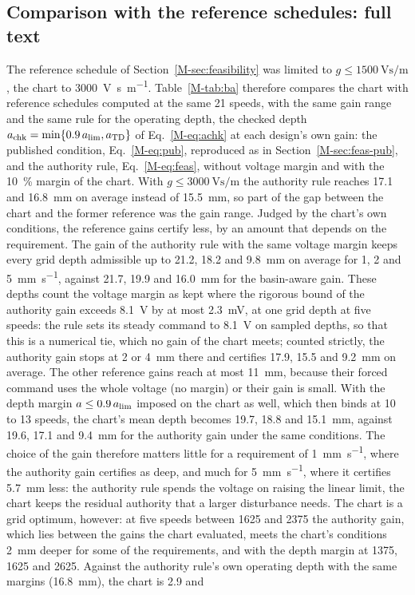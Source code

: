 \subsection{Comparison with the reference schedules: full text}\label{supp:std-ba-compare}

The reference schedule of Section~\ref{M-sec:feasibility} was limited to $g\le\SI{1500}{\volt\second\per\metre}$, the chart to \SI{3000}{\volt\second\per\metre}. Table~\ref{M-tab:ba} therefore compares the chart with reference schedules computed at the same 21 speeds, with the same gain range and the same rule for the operating depth, the checked depth $a_{\mathrm{chk}}=\min\{0.9\,a_{\lim},a_{\mathrm{TD}}\}$ of Eq.~\eqref{M-eq:achk} at each design's own gain: the published condition, Eq.~\eqref{M-eq:pub}, reproduced as in Section~\ref{M-sec:feas-pub}, and the authority rule, Eq.~\eqref{M-eq:feas}, without voltage margin and with the \SI{10}{\percent} margin of the chart. With $g\le\SI{3000}{\volt\second\per\metre}$ the authority rule reaches 17.1 and \SI{16.8}{\milli\metre} on average instead of \SI{15.5}{\milli\metre}, so part of the gap between the chart and the former reference was the gain range. Judged by the chart's own conditions, the reference gains certify less, by an amount that depends on the requirement. The gain of the authority rule with the same voltage margin keeps every grid depth admissible up to 21.2, 18.2 and \SI{9.8}{\milli\metre} on average for 1, 2 and \SI{5}{\milli\metre\per\second}, against 21.7, 19.9 and \SI{16.0}{\milli\metre} for the basin-aware gain. These depths count the voltage margin as kept where the rigorous bound of the authority gain exceeds \SI{8.1}{\volt} by at most \SI{2.3}{\milli\volt}, at one grid depth at five speeds: the rule sets its steady command to \SI{8.1}{\volt} on sampled depths, so that this is a numerical tie, which no gain of the chart meets; counted strictly, the authority gain stops at 2 or \SI{4}{\milli\metre} there and certifies 17.9, 15.5 and \SI{9.2}{\milli\metre} on average. The other reference gains reach at most \SI{11}{\milli\metre}, because their forced command uses the whole voltage (no margin) or their gain is small. With the depth margin $a\le0.9\,a_{\lim}$ imposed on the chart as well, which then binds at 10 to 13 speeds, the chart's mean depth becomes 19.7, 18.8 and \SI{15.1}{\milli\metre}, against 19.6, 17.1 and \SI{9.4}{\milli\metre} for the authority gain under the same conditions. The choice of the gain therefore matters little for a requirement of \SI{1}{\milli\metre\per\second}, where the authority gain certifies as deep, and much for \SI{5}{\milli\metre\per\second}, where it certifies \SI{5.7}{\milli\metre} less: the authority rule spends the voltage on raising the linear limit, the chart keeps the residual authority that a larger disturbance needs. The chart is a grid optimum, however: at five speeds between 1625 and \SI{2375}{\rpm} the authority gain, which lies between the gains the chart evaluated, meets the chart's conditions \SI{2}{\milli\metre} deeper for some of the requirements, and with the depth margin at 1375, 1625 and \SI{2625}{\rpm}. Against the authority rule's own operating depth with the same margins (\SI{16.8}{\milli\metre}), the chart is 2.9 and 